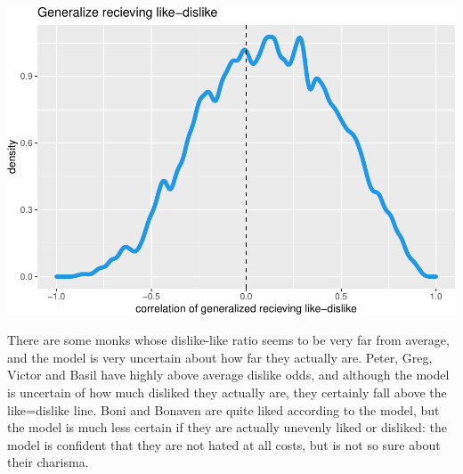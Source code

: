 \documentclass[
]{article}
\begin{document}
\begin{center}\includegraphics{Geraldes-week08_files/figure-latex/unnamed-chunk-17-3} \end{center}

There are some monks whose dislike-like ratio seems to be very far from
average, and the model is very uncertain about how far they actually
are. Peter, Greg, Victor and Basil have highly above average dislike
odds, and although the model is uncertain of how much disliked they
actually are, they certainly fall above the like=dislike line. Boni and
Bonaven are quite liked according to the model, but the model is much
less certain if they are actually unevenly liked or disliked: the model
is confident that they are not hated at all costs, but is not so sure
about their charisma.
\end{document}
